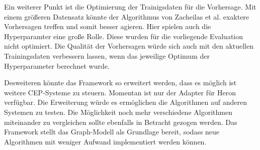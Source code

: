 Ein weiterer Punkt ist die Optimierung der Trainigsdaten für die Vorhersage.
Mit einem größeren Datensatz könnte der Algorithmus von Zacheilas et al. exaktere Vorhersagen treffen und somit besser agieren.
Hier spielen auch die Hyperparamter eine große Rolle.
Diese wurden für die vorliegende Evaluation nicht optimiert.
Die Qualität der Vorhersagen würde sich auch mit den aktuellen Trainingsdaten verbessern lassen, wenn das jeweilige Optimum der Hyperparameter berechnet wurde.

Desweiteren könnte das Framework so erweitert werden, dass es möglich ist weitere CEP-Systeme zu steuern.
Momentan ist nur der Adapter für Heron verfügbar.
Die Erweiterung würde es ermöglichen die Algorithmen auf anderen Systemen zu testen.
Die Möglichkeit noch mehr verschiedene Algorithmen miteinander zu vergleichen sollte ebenfalls in Betracht gezogen werden.
Das Framework stellt das Graph-Modell als Grundlage bereit, sodass neue Algorithmen mit weniger Aufwand implementiert werden können.
